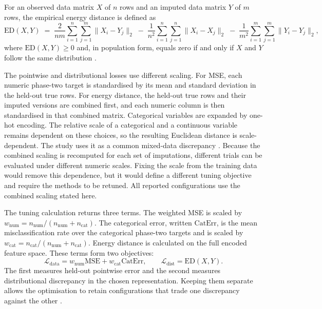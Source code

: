 For an observed data matrix $X$ of $n$ rows and an imputed data matrix $Y$ of $m$ rows, the empirical energy distance is defined as
\begin{equation}
    \mathrm{ED}(X, Y) \;=\; \frac{2}{nm} \sum_{i=1}^{n}\sum_{j=1}^{m}
    \|X_i - Y_j\|_2
    \;-\; \frac{1}{n^2} \sum_{i=1}^{n}\sum_{j=1}^{n} \|X_i - X_j\|_2
    \;-\; \frac{1}{m^2} \sum_{i=1}^{m}\sum_{j=1}^{m} \|Y_i - Y_j\|_2,
    \label{eq:energy_distance}
\end{equation}
where $\mathrm{ED}(X, Y) \geq 0$ and, in population form, equals zero if and only if $X$ and $Y$ follow the same distribution \citep{szekely2003statistics}. 

The pointwise and distributional losses use different scaling. For MSE, each numeric phase-two target is standardised by its mean and standard deviation in the held-out true rows. For energy distance, the held-out true rows and their imputed versions are combined first, and each numeric column is then standardised in that combined matrix. Categorical variables are expanded by one-hot encoding. The relative scale of a categorical and a continuous variable remains dependent on these choices, so the resulting Euclidean distance is scale-dependent. The study uses it as a common mixed-data discrepancy \citep{naf2025mar}. Because the combined scaling is recomputed for each set of imputations, different trials can be evaluated under different numeric scales. Fixing the scale from the training data would remove this dependence, but it would define a different tuning objective and require the methods to be retuned. All reported configurations use the combined scaling stated here.

The tuning calculation returns three terms. The weighted MSE is scaled by $w_{\mathrm{num}} = n_{\mathrm{num}}/(n_{\mathrm{num}}+n_{\mathrm{cat}})$. The categorical error, written $\mathrm{CatErr}$, is the mean misclassification rate over the categorical phase-two targets and is scaled by $w_{\mathrm{cat}} = n_{\mathrm{cat}}/(n_{\mathrm{num}}+n_{\mathrm{cat}})$. Energy distance is calculated on the full encoded feature space. These terms form two objectives:
\[
\mathcal{L}_{\mathrm{data}}
=w_{\mathrm{num}}\mathrm{MSE}+w_{\mathrm{cat}}\mathrm{CatErr},
\qquad
\mathcal{L}_{\mathrm{dist}}=\mathrm{ED}(X,Y).
\]
The first measures held-out pointwise error and the second measures distributional discrepancy in the chosen representation. Keeping them separate allows the optimisation to retain configurations that trade one discrepancy against the other \citep{naf2023imputation}.

